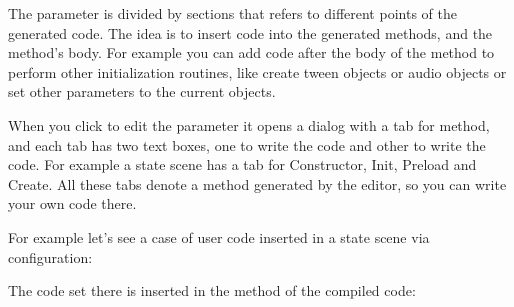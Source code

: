 \documentclass[letterpaper,10pt,english]{sphinxmanual}
\begin{document}
The  parameter is divided by sections that refers to different points of the generated code. The idea is to insert code into the generated methods,  and  the method’s body. For example you can add code after the body of the method  to perform other initialization routines, like create tween objects or audio objects or set other parameters to the current objects.

When you click to edit the  parameter it opens a dialog with a tab for method, and each tab has two text boxes, one to write the  code and other to write the  code. For example a state scene  has a tab for Constructor, Init, Preload and Create. All these tabs denote a method generated by the editor, so you can write your own code there.

For example let’s see a case of user code inserted in a state scene via configuration:

\noindent{}

The code set there is inserted in the  method of the compiled code:

\begin{sphinxVerbatim}[commandchars=\\\{\}]
    


          

              
         

           


\end{sphinxVerbatim}
\end{document}
